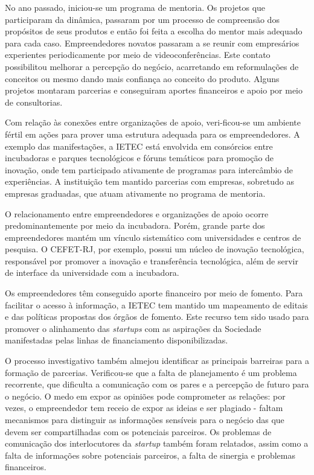 \documentclass{sig-alternate-05-2015}
\begin{document}
No ano passado, iniciou-se um programa de mentoria. Os projetos que participaram da dinâmica, passaram por um processo de compreensão dos propósitos de seus produtos e então foi feita a escolha do mentor mais adequado para cada caso. Empreendedores novatos passaram a se reunir com empresários experientes periodicamente por meio de videoconferências.  Este contato possibilitou melhorar a percepção do negócio, acarretando em reformulações de conceitos ou mesmo dando mais confiança ao conceito do produto. Alguns projetos montaram parcerias e conseguiram aportes financeiros e apoio por meio de consultorias. 

Com relação às conexões entre organizações de apoio, veri-ficou-se um ambiente fértil em ações para prover uma estrutura adequada para os empreendedores. A exemplo das manifestações, a IETEC está envolvida em consórcios entre incubadoras e parques tecnológicos e fóruns temáticos para promoção de inovação, onde tem participado ativamente de programas para intercâmbio de experiências. A instituição tem mantido parcerias com empresas, sobretudo as empresas graduadas, que atuam ativamente no programa de mentoria. 

O relacionamento entre empreendedores e organizações de apoio ocorre predominantemente por meio da incubadora. Porém, grande parte dos empreendedores mantém um vínculo sistemático com universidades e centros de pesquisa. O CEFET-RJ, por exemplo, possui um núcleo de inovação tecnológica, responsável por promover a inovação e transferência tecnológica, além de servir de interface da universidade com a incubadora. 

Os empreendedores têm conseguido aporte financeiro por meio de fomento. Para facilitar o acesso à informação, a IETEC tem mantido um mapeamento de editais e das políticas propostas dos órgãos de fomento. Este recurso tem sido usado para promover o alinhamento das \textit{startups} com as aspirações da Sociedade manifestadas pelas linhas de financiamento disponibilizadas.

O processo investigativo também almejou identificar as principais barreiras para a formação de parcerias. Verificou-se que a falta de planejamento é um problema recorrente, que dificulta a comunicação com os pares e a percepção de futuro para o negócio. O medo em expor as opiniões pode comprometer as relações: por vezes, o empreendedor tem receio de expor as ideias e ser plagiado - faltam mecanismos para distinguir as informações sensíveis para o negócio das que devem ser compartilhadas com os potenciais parceiros. Os problemas de comunicação dos interlocutores da \textit{startup} também foram relatados, assim como a falta de informações sobre potenciais parceiros, a falta de sinergia e problemas financeiros. 
\end{document}
